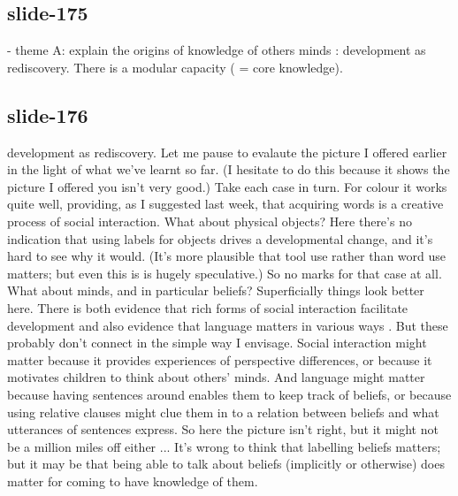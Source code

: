\documentclass[12pt,\papersize]{extarticle}
\begin{document}
 
\subsection{slide-175}
- theme A: explain the origins of knowledge of others minds : development as rediscovery. There is a modular capacity ( = core knowledge).
 
 
\subsection{slide-176}
development as rediscovery.
Let me pause to evalaute the picture I offered earlier in the light of what we've learnt so far.
(I hesitate to do this because it shows the picture I offered you isn't very good.)
Take each case in turn.
For colour it works quite well, providing, as I suggested last week, that acquiring words is a creative process of social interaction.
What about physical objects? Here there's no indication that using labels for objects drives a developmental change, and it's hard to see why it would.
(It's more plausible that tool use rather than word use matters; but even this is is hugely speculative.)
So no marks for that case at all.
What about minds, and in particular beliefs?
Superficially things look better here. There is both evidence that rich forms of social interaction facilitate development \citep{Hughes:2006fu}
and also evidence that language matters in various ways \citep{Astington2005ot}.
But these probably don't connect in the simple way I envisage.
Social interaction might matter because it provides experiences of perspective differences, or because it motivates children to think about others' minds.
And language might matter because having sentences around enables them to keep track of beliefs, or because using relative clauses might clue them in to a relation between beliefs and what utterances of sentences express.
So here the picture isn't right, but it might not be a million miles off either ...
It's wrong to think that labelling beliefs matters; but it may be that being able to talk about beliefs (implicitly or otherwise) does matter for coming to have knowledge of them.

 






\end{document}
